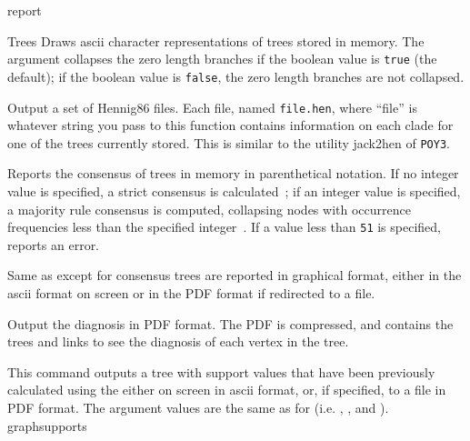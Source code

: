 \begin{command}{report}{}
\begin{arguments}
\begin{argumentgroup}{Trees}
                {Draws ascii character representations of trees stored in memory. The
                argument  collapses the zero length branches if
                the boolean value is \texttt{true} (the default); if the boolean value is
                \texttt{false}, the zero length branches are not collapsed.}
                {}

               {Output a set of Hennig86 files. Each file, named \texttt{file.hen},
                where ``file'' is whatever string you pass to this function
                contains information on each clade for one of the trees
                currently stored. This is similar to the utility jack2hen 
                of \texttt{POY3}.}
                {}

                {Reports the consensus of trees in memory in parenthetical notation.
                If no integer value is specified, a strict consensus is
                calculated~\cite{rohlf1982}; if an integer value is
                specified, a majority rule consensus is computed, collapsing
                nodes with occurrence frequencies less than the specified
                integer~\cite{margush1981}.  If a value less than
                \texttt{51} is specified, \poy reports an error.}
                {}

                {Same as  except for consensus trees are
                reported in graphical format, either in the ascii format on
                screen or in the PDF format if redirected to a file.}
                {}

                {Output the diagnosis in PDF format. The PDF is compressed, and
                contains the trees and links to see the diagnosis of each vertex
                in the tree.}
                {}

                {This command outputs a tree with support values that have
                been previously calculated using the
                 either on screen
                in ascii format, or, if specified, to a file in PDF
                format. The argument values are the same as for 
                 (i.e. ,
                , and ).} 
                {graphsupports}


\end{argumentgroup}
\end{arguments}
\end{command}
